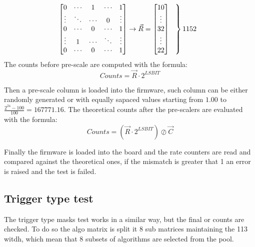 \documentclass[a4paper,11pt]{article}
\begin{document}
\[
\begin{bmatrix}
    0  & \cdots & 1 & \cdots & 1      \\
    \vdots  & \ddots & \cdots & 0 & \vdots       \\
    0  &\cdots & 0 & \cdots & 1       \\
    \vdots  &1&\cdots & \ddots & \vdots       \\
    0  & \cdots & 0 & \cdots & 1       
\end{bmatrix}
\rightarrow \vec{R} = 
\begin{bmatrix}
    10      \\
    \vdots      \\
    32     \\
    \vdots      \\
    22       
\end{bmatrix}  
\begin{tabular}{l}
$\left.\lefteqn{\phantom{\begin{matrix} 0\\ \ddots\\ 0\\ \ddots\\ 0\  \end{matrix}}}\right\}1152$
\end{tabular}
\]
The counts before pre-scale are computed with the formula:
\begin{equation}
    Counts = \vec{R} \cdot  2^{LSBIT}
\end{equation}

Then a pre-scale column is loaded into the firmware, such column can be either randomly generated or with equally sapaced values starting from $1.00$ to $\frac{2^{24}-100}{100}=167771.16$. The theoretical counts after the pre-scalers are evaluated with the formula:
\begin{equation}
    Counts = (\vec{R} \cdot  2^{LSBIT}) \oslash \vec{C} 
\end{equation}

Finally the firmware is loaded into the board and the rate counters are read and compared against the theoretical ones, if the mismatch is greater that 1 an error is raised and the test is failed.

\subsection{Trigger type test}

The trigger type masks test works in a similar way, but the final or counts are checked. To do so the algo matrix is split it 8 sub matrices  maintaining the 113 witdh, which mean that 8 subsets of algorithms are selected from the pool.  
\end{document}
